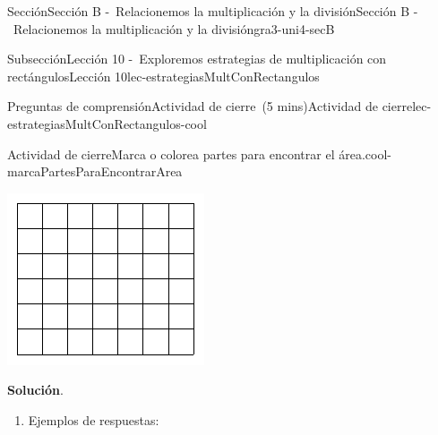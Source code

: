\documentclass[oneside,10pt,]{article}
\newcommand{\blocktitlefont}{\relax}
\begin{document}
\begin{sectionptx}{Sección}{Sección B -~Relacionemos la multiplicación y la división}{}{Sección B -~Relacionemos la multiplicación y la división}{}{}{gra3-uni4-secB}
\begin{subsectionptx}{Subsección}{Lección 10 -~Exploremos estrategias de multiplicación con rectángulos}{}{Lección 10}{}{}{lec-estrategiasMultConRectangulos}
\begin{reading-questions-subsubsection}{Preguntas de comprensión}{Actividad de cierre~(5 mins)}{}{Actividad de cierre}{}{}{lec-estrategiasMultConRectangulos-cool}
\begin{project}{Actividad de cierre}{Marca o colorea partes para encontrar el área.}{cool-marcaPartesParaEncontrarArea}
\begin{sidebyside}{2}{0}{0}{0}
\begin{sbspanel}{0.4}
\includegraphics[width=\linewidth]{external/svg-source/tikz-file-153042.pdf}
\end{sbspanel}%
\end{sidebyside}%
\par\smallskip%
\noindent\textbf{\blocktitlefont Solución}.\hypertarget{cool-marcaPartesParaEncontrarArea-3}{}\quad{}%
\begin{enumerate}[label={(\alph*)}]
\item{}\begin{sidebyside}{3}{0.0166666666666667}{0.0166666666666667}{0.0333333333333333}%
\begin{sbspanel}{0.2}%
Ejemplos de respuestas:%
\end{sbspanel}%
\begin{sbspanel}{0.35}%

\end{sbspanel}
\end{sidebyside}
\end{enumerate}
\end{project}
\end{reading-questions-subsubsection}
\end{subsectionptx}
\end{sectionptx}
\end{document}
